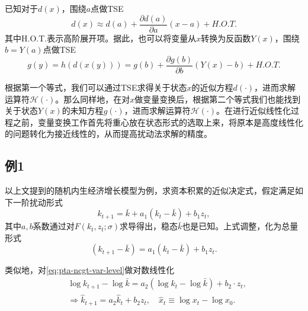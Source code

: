 已知对于$d(x)$，围绕$a$点做TSE
\begin{equation*}
  d(x) \approx d(a) + \frac{\partial d(a)}{\partial a} (x - a) + H.O.T.
\end{equation*}
其中H.O.T.表示高阶展开项。据此，也可以将变量从$x$转换为反函数$Y(x)$，围绕$b=Y(a)$点做TSE
\begin{equation*}
  g(y) = h ( d( x (y))) = g(b) + \frac{\partial g(b)}{\partial b}(Y(x) - b) + H.O.T.
\end{equation*}

根据第一个等式，我们可以通过TSE求得关于状态$x$的近似方程$d(\cdot)$，进而求解运算符$\mathcal{H}(\cdot)$。那么同样地，在对$x$做变量变换后，根据第二个等式我们也能找到关于状态$Y(x)$的未知方程$g(\cdot)$，进而求解运算符$\mathcal{H}(\cdot)$。在进行近似线性化过程之前，变量变换工作首先将重心放在状态形式的选取上来，将原本是高度线性化的问题转化为接近线性的，从而提高扰动法求解的精度。

\subsection{例1}
以上文提到的随机内生经济增长模型为例，求资本积累的近似决定式，假定满足如下一阶扰动形式
\begin{equation*}
  k_{t+1} = \bar{k} + a_1 \left( k_t - \bar{k} \right) + b_1 z_t,
\end{equation*}
其中$a,b$系数通过对$F(k_t,z_t;\sigma)$求导得出，稳态$\bar{k}$也是已知。上式调整，化为总量形式
\begin{equation}
  \label{eq:pta-ncgt-var-level}
  \left( k_{t+1}-\bar{k} \right) = a_1 \left( k_t - \bar{k} \right) + b_1 z_t.
\end{equation}

类似地，对\eqref{eq:pta-ncgt-var-level}做对数线性化
\begin{equation}
  \label{eq:pta-ncgt-var-loglin}
  \begin{split}
    &\log k_{t+1} - \log \bar{k} = a_2 \left( \log k_t - \log \bar{k} \right) + b_2 \cdot z_t, \\
    &\Rightarrow \hat{k}_{t+1} = a_2 \hat{k}_t + b_2 z_t, \quad \hat{x}_t \equiv \log x_t - \log x_0.
  \end{split}
\end{equation}

